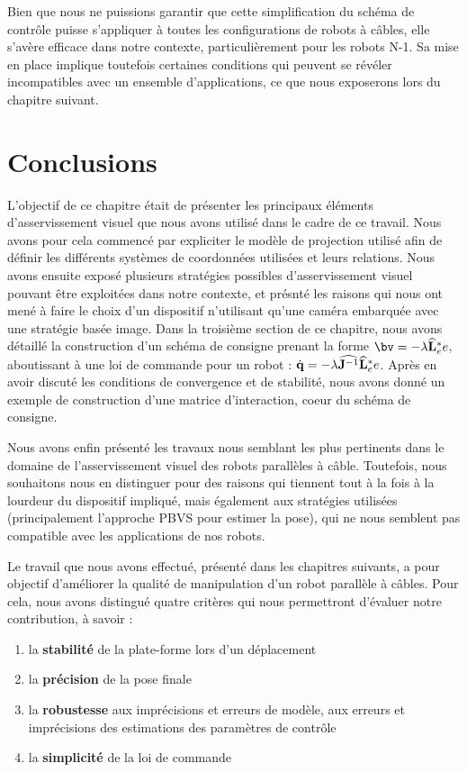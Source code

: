 Bien que nous ne puissions garantir que cette simplification du sch\'ema de
contr\^ole puisse s'appliquer \`a toutes les configurations de robots \`a
c\^ables, elle s'av\`ere efficace dans notre contexte, particuli\`erement pour
les robots N-1. Sa mise en place implique toutefois certaines conditions qui
peuvent se r\'ev\'eler incompatibles avec un ensemble d'applications, ce que
nous exposerons lors du chapitre suivant.

\section{Conclusions}

L'objectif de ce chapitre \'etait de pr\'esenter les principaux \'el\'ements 
d'asservisse\-ment visuel que nous avons utilis\'e dans le cadre de ce travail. 
Nous avons pour cela commenc\'e par expliciter le mod\`ele de projection 
utilis\'e afin de d\'efinir les diff\'erents syst\`emes de coordonn\'ees 
utilis\'ees et leurs relations. Nous avons ensuite expos\'e plusieurs 
strat\'egies possibles d'asservissement visuel pouvant \^etre exploit\'ees dans 
notre contexte, et pr\'esnt\'e les raisons qui nous ont men\'e \`a faire le 
choix d'un dispositif n'utilisant qu'une cam\'era embarqu\'ee avec une 
strat\'egie bas\'ee image. Dans la troisi\`eme section de ce chapitre, nous 
avons d\'etaill\'e la construction d'un sch\'ema de consigne prenant la forme 
${\bv} = -\lambda \widehat {\bf L}^*_e e$, aboutissant \`a une loi de commande 
pour un robot : $\dot {\bf q} = -\lambda \widehat {{\bf J}^{-1}} \widehat {\bf 
L}^*_e e$. Apr\`es en avoir discut\'e les conditions de convergence et de 
stabilit\'e, nous avons donn\'e un exemple de construction d'une matrice 
d'interaction, coeur du sch\'ema de consigne.

Nous avons enfin pr\'esent\'e les travaux nous semblant les plus pertinents 
dans le domaine de l'asservissement visuel des robots parall\`eles \`a 
c\^able\cite{dallej2011}. Toutefois, nous souhaitons nous en distinguer pour des 
raisons qui tiennent tout \`a la fois \`a la lourdeur du dispositif impliqu\'e, 
mais \'egalement aux strat\'egies utilis\'ees (principalement l'approche PBVS 
pour estimer la pose), qui ne nous semblent pas compatible avec les applications 
de nos robots.

Le travail que nous avons effectu\'e, pr\'esent\'e dans les chapitres suivants, 
a pour objectif d'am\'eliorer la qualit\'e de manipulation d'un robot 
parall\`ele \`a c\^ables. Pour cela, nous avons distingu\'e quatre crit\`eres 
qui nous permettront d'\'evaluer notre
contribution, \`a savoir :
\begin{enumerate}
 \item la {\bf stabilit\'e} de la plate-forme lors d'un d\'eplacement
 \item la {\bf pr\'ecision} de la pose finale
 \item la {\bf robustesse} aux impr\'ecisions et erreurs de mod\`ele, aux
erreurs et impr\'ecisions des estimations des param\`etres de contr\^ole
  \item la {\bf simplicit\'e} de la loi de commande
\end{enumerate}

